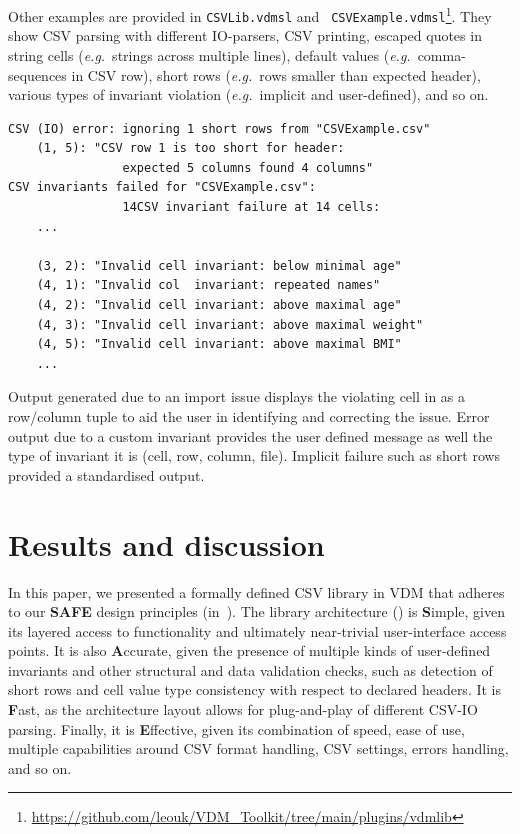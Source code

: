 \documentclass[runningheads,a4paper]{llncs}
\newcommand{\lfcomment}[1]{{\scriptsize\textcolor{red}{LF:~#1}}}  %
\begin{document}
Other examples are provided in \texttt{CSVLib.vdmsl} and \texttt{ CSVExample.vdmsl}\footnote{\url{https://github.com/leouk/VDM_Toolkit/tree/main/plugins/vdmlib}}. They show CSV parsing with different IO-parsers, CSV printing, escaped quotes in string cells (\textit{e.g.}~strings across multiple lines), default values (\textit{e.g.}~comma-sequences in CSV row), short rows (\textit{e.g.}~rows smaller than expected header), various types of invariant violation (\textit{e.g.}~implicit and user-defined), and so on.

\begin{lstlisting}[]
CSV (IO) error: ignoring 1 short rows from "CSVExample.csv"
    (1, 5): "CSV row 1 is too short for header: 
                expected 5 columns found 4 columns"
CSV invariants failed for "CSVExample.csv": 
                14CSV invariant failure at 14 cells: 
    ...

    (3, 2): "Invalid cell invariant: below minimal age"
    (4, 1): "Invalid col  invariant: repeated names"
    (4, 2): "Invalid cell invariant: above maximal age"
    (4, 3): "Invalid cell invariant: above maximal weight"
    (4, 5): "Invalid cell invariant: above maximal BMI"
    ...  
\end{lstlisting}

Output generated due to an import issue displays the violating cell in as a row/column tuple to aid the user in identifying and correcting the issue. Error output due to a custom invariant provides the user defined message as well the type of invariant it is (cell, row, column, file). Implicit failure such as short rows provided a standardised output.




\section{Results and discussion}\label{sec:Results}

In this paper, we presented a formally defined CSV library in VDM that adheres to our \textbf{SAFE} design principles (in~). The library architecture () is \textbf{S}imple, given its layered access to functionality and ultimately near-trivial user-interface access points. It is also \textbf{A}ccurate, given the presence of multiple kinds of user-defined invariants and other structural and data validation checks, such as detection of short rows and cell value type consistency with respect to declared headers. It is \textbf{F}ast, as the architecture layout allows for plug-and-play of different CSV-IO parsing. Finally, it is \textbf{E}ffective, given its combination of speed, ease of use, multiple capabilities around CSV format handling, CSV settings, errors handling, and so on.   
\end{document}
